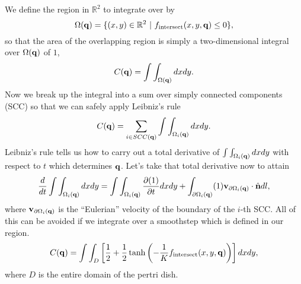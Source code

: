 We define the region in $\mathbb{R}^2$ to integrate over by 
\begin{equation}
    \Omega(\vb{q}) = \{ (x,y) \in \mathbb{R}^2 \ | \ f_{\textrm{intersect}}(x,y,\vb{q}) \leq 0 \},
\end{equation}
so that the area of the overlapping region is simply a two-dimensional integral over $\Omega(\vb{q})$ of $1$,
\begin{equation}
    C(\vb{q}) = \int\int_{\Omega(\vb{q})} dxdy.
\end{equation}
Now we break up the integral into a sum over simply connected components (SCC) so that we can safely apply Leibniz's rule
\begin{equation}
    C(\vb{q}) = \sum_{i \in SCC(\vb{q})}\int\int_{\Omega_i(\vb{q})} dxdy.
\end{equation}
Leibniz's rule tells us how to carry out a total derivative of $\int\int_{\Omega_i(\vb{q})} dxdy$ with respect to $t$ which determines $\vb{q}$. Let's take that total
derivative now to attain
\begin{equation}
   \frac{d}{dt}\int\int_{\Omega_i(\vb{q})} dxdy = \int\int_{\Omega_i(\vb{q})} \pdv{(1)}{t} dxdy + 
   \int_{\partial \Omega_i(\vb{q})} (1) \vb{v}_{\partial \Omega_i(\vb{q})} \cdot \hat{\vb{n}} dl,
\end{equation}
where $\vb{v}_{\partial \Omega_i(\vb{q})}$ is the ``Eulerian'' velocity of the boundary of the $i$-th SCC. All of this can be avoided if we integrate over a smoothstep
which is defined in our region.
\begin{equation}
    C(\vb{q}) = \int\int_{D} \left[ \frac{1}{2} +\frac{1}{2} \tanh{ \left(- \frac{1}{K}f_{\textrm{intersect}}(x,y,\vb{q}) \right)}\right]dxdy,
\end{equation}
where $D$ is the entire domain of the pertri dish.


